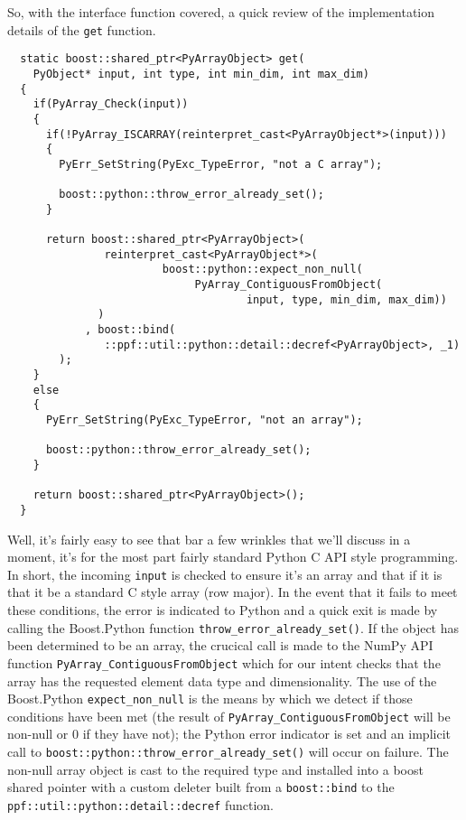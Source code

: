 So, with the interface function covered, a quick review of the
implementation details of the \verb|get| function.
\begin{verbatim}
  static boost::shared_ptr<PyArrayObject> get(
    PyObject* input, int type, int min_dim, int max_dim)
  {
    if(PyArray_Check(input))
    {
      if(!PyArray_ISCARRAY(reinterpret_cast<PyArrayObject*>(input)))
      {
        PyErr_SetString(PyExc_TypeError, "not a C array");
  
        boost::python::throw_error_already_set();
      }
  
      return boost::shared_ptr<PyArrayObject>(
               reinterpret_cast<PyArrayObject*>(
                        boost::python::expect_non_null(
                             PyArray_ContiguousFromObject(
                                     input, type, min_dim, max_dim))
              )
            , boost::bind(
               ::ppf::util::python::detail::decref<PyArrayObject>, _1)
        );
    }
    else
    {
      PyErr_SetString(PyExc_TypeError, "not an array");
  
      boost::python::throw_error_already_set();
    }
  
    return boost::shared_ptr<PyArrayObject>();
  }

\end{verbatim}
Well, it's fairly easy to see that bar a few wrinkles that we'll
discuss in a moment, it's for the most part fairly standard Python C
API style programming. In short, the incoming \verb|input| is checked
to ensure it's an array and that if it is that it be a standard C
style array (row major). In the event that it fails to meet these
conditions, the error is indicated to Python and a quick exit is made
by calling the Boost.Python function
\verb|throw_error_already_set()|. If the object has been determined to
be an array, the crucical call is made to the NumPy API function
\verb|PyArray_ContiguousFromObject| which for our intent checks that
the array has the requested element data type and dimensionality. The
use of the Boost.Python \verb|expect_non_null| is the means by which we
detect if those conditions have been met (the result of
\verb|PyArray_ContiguousFromObject| will be non-null or 0 if they have
not); the Python error indicator is set and an implicit call to
\verb|boost::python::throw_error_already_set()| will occur on failure.
The non-null array object is cast to the required type and
installed into a boost shared pointer with a custom deleter built from
a \verb|boost::bind| to the \verb|ppf::util::python::detail::decref|
function.

